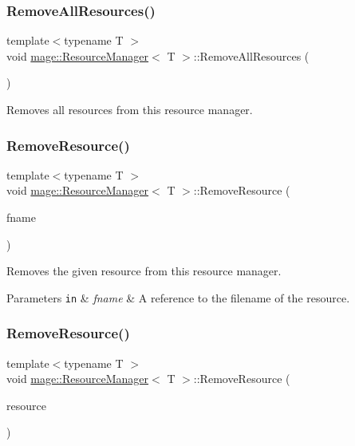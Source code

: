 \subsubsection{\texorpdfstring{Remove\+All\+Resources()}{RemoveAllResources()}}
{\footnotesize\ttfamily template$<$typename T $>$ \\
void \hyperlink{classmage_1_1_resource_manager}{mage\+::\+Resource\+Manager}$<$ T $>$\+::Remove\+All\+Resources (\begin{DoxyParamCaption}{ }\end{DoxyParamCaption})}

Removes all resources from this resource manager. \hypertarget{classmage_1_1_resource_manager_af805bcef1e71693e215741472c7d9534}{}\label{classmage_1_1_resource_manager_af805bcef1e71693e215741472c7d9534} 
\subsubsection{\texorpdfstring{Remove\+Resource()}{RemoveResource()}\hspace{0.1cm}{\footnotesize\ttfamily [1/2]}}
{\footnotesize\ttfamily template$<$typename T $>$ \\
void \hyperlink{classmage_1_1_resource_manager}{mage\+::\+Resource\+Manager}$<$ T $>$\+::Remove\+Resource (\begin{DoxyParamCaption}\item[{const wstring \&}]{fname }\end{DoxyParamCaption})}

Removes the given resource from this resource manager.


\begin{DoxyParams}[1]{Parameters}
\mbox{\tt in}  & {\em fname} & A reference to the filename of the resource. \\
\hline
\end{DoxyParams}
\hypertarget{classmage_1_1_resource_manager_ac557e5047590d0403291557c88966574}{}\label{classmage_1_1_resource_manager_ac557e5047590d0403291557c88966574} 
\subsubsection{\texorpdfstring{Remove\+Resource()}{RemoveResource()}\hspace{0.1cm}{\footnotesize\ttfamily [2/2]}}
{\footnotesize\ttfamily template$<$typename T $>$ \\
void \hyperlink{classmage_1_1_resource_manager}{mage\+::\+Resource\+Manager}$<$ T $>$\+::Remove\+Resource (\begin{DoxyParamCaption}\item[{\hyperlink{namespacemage_a1e01ae66713838a7a67d30e44c67703e}{Shared\+Ptr}$<$ T $>$}]{resource }\end{DoxyParamCaption})}

